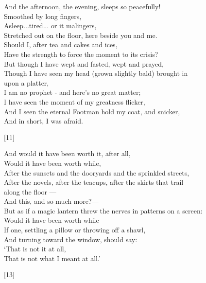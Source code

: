 \documentclass[twoside]{article}
\begin{document}
\begin{multicols}{2}

\begin{minipage}{10cm}
    \onehalfspacing
    And the afternoon, the evening, sleeps so peacefully!\\
    Smoothed by long fingers,\\
    Asleep...tired... or it malingers,\\
    Stretched out on the floor, here beside you and me.\\
    Should I, after tea and cakes and ices,\\
    Have the strength to force the moment to its crisis?\\
    But though I have wept and fasted, wept and prayed,\\
    Though I have seen my head (grown slightly bald) brought in\\
    \quad{}upon a platter,\\
    I am no prophet - and here's no great matter;\\
    I have seen the moment of my greatness flicker,\\
    And I seen the eternal Footman hold my coat, and snicker,\\
    And in short, I was afraid.
    \begin{center}[11]\end{center}

\smallskip
\begin{minipage}{10cm}
    And would it have been worth it, after all,\\
    Would it have been worth while,\\
    After the sunsets and the dooryards and the sprinkled streets,\\
    After the novels, after the teacups, after the skirts that trail\\
    \quad{}along the floor ---\\
    And this, and so much more?---\\
    But as if a magic lantern threw the nerves in patterns on a screen:\\
    Would it have been worth while\\
    If one, settling a pillow or throwing off a shawl,\\
    And turning toward the window, should say:\\
    \quad{}`That is not it at all,\\
    \quad{}That is not what I meant at all.'
    \begin{center}[13]\end{center}
\end{minipage}
\end{minipage}



\end{multicols}
\end{document}
